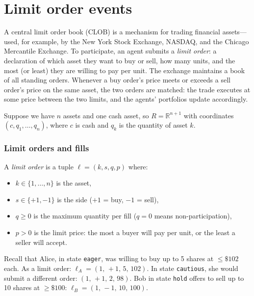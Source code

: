 \section*{Limit order events}

A central limit order book (CLOB) is a mechanism for trading financial assets---used, for example, by the New York Stock Exchange, NASDAQ, and the Chicago Mercantile Exchange.  To participate, an agent submits a \emph{limit order}: a declaration of which asset they want to buy or sell, how many units, and the most (or least) they are willing to pay per unit.  The exchange maintains a book of all standing orders.  Whenever a buy order's price meets or exceeds a sell order's price on the same asset, the two orders are matched: the trade executes at some price between the two limits, and the agents' portfolios update accordingly.

Suppose we have $n$ assets and one cash asset, so $R = \mathbb{R}^{n+1}$ with coordinates $(c, q_1, \ldots, q_n)$, where $c$ is cash and $q_k$ is the quantity of asset $k$.

\subsubsection*{Limit orders and fills}

\begin{definition}\label{def:limit-order}
A \emph{limit order} is a tuple $\ell = (k, s, q, p)$ where:
\begin{itemize}
\item $k \in \{1,\ldots,n\}$ is the asset,
\item $s \in \{+1,-1\}$ is the side ($+1$ = buy, $-1$ = sell),
\item $q \geq 0$ is the maximum quantity per fill ($q = 0$ means non-participation),
\item $p > 0$ is the limit price: the most a buyer will pay per unit, or the least a seller will accept.
\end{itemize}
\end{definition}

Recall that Alice, in state \texttt{eager}, was willing to buy up to 5 shares at $\leq\$102$ each.  As a limit order: $\ell_A = (1,\,+1,\,5,\,102)$.  In state \texttt{cautious}, she would submit a different order: $(1,\,+1,\,2,\,98)$.  Bob in state \texttt{hold} offers to sell up to 10 shares at $\geq\$100$: $\ell_B = (1,\,-1,\,10,\,100)$.

